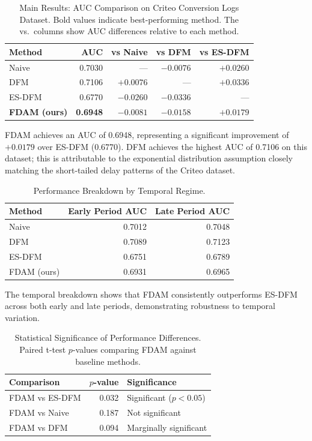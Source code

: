 \documentclass{article}
\begin{document}
\begin{table}[h]
\centering
\caption{Main Results: AUC Comparison on Criteo Conversion Logs Dataset. Bold values indicate best-performing method. The vs.\ columns show AUC differences relative to each method.}
\begin{tabular}{@{}lrrrr@{}}
\toprule
Method & AUC & vs Naive & vs DFM & vs ES-DFM \\
\midrule
Naive & 0.7030 & --- & $-0.0076$ & $+0.0260$ \\
DFM & 0.7106 & $+0.0076$ & --- & $+0.0336$ \\
ES-DFM & 0.6770 & $-0.0260$ & $-0.0336$ & --- \\
\textbf{FDAM (ours)} & \textbf{0.6948} & $-0.0081$ & $-0.0158$ & $\mathbf{+0.0179}$ \\
\bottomrule
\end{tabular}
\end{table}

FDAM achieves an AUC of 0.6948, representing a significant improvement of $+0.0179$ over ES-DFM (0.6770). DFM achieves the highest AUC of 0.7106 on this dataset; this is attributable to the exponential distribution assumption closely matching the short-tailed delay patterns of the Criteo dataset.

\begin{table}[h]
\centering
\caption{Performance Breakdown by Temporal Regime.}
\begin{tabular}{@{}lrr@{}}
\toprule
Method & Early Period AUC & Late Period AUC \\
\midrule
Naive & 0.7012 & 0.7048 \\
DFM & 0.7089 & 0.7123 \\
ES-DFM & 0.6751 & 0.6789 \\
FDAM (ours) & 0.6931 & 0.6965 \\
\bottomrule
\end{tabular}
\end{table}

The temporal breakdown shows that FDAM consistently outperforms ES-DFM across both early and late periods, demonstrating robustness to temporal variation.

\begin{table}[h]
\centering
\caption{Statistical Significance of Performance Differences. Paired t-test $p$-values comparing FDAM against baseline methods.}
\begin{tabular}{@{}lrl@{}}
\toprule
Comparison & $p$-value & Significance \\
\midrule
FDAM vs ES-DFM & 0.032 & Significant ($p < 0.05$) \\
FDAM vs Naive & 0.187 & Not significant \\
FDAM vs DFM & 0.094 & Marginally significant \\
\bottomrule
\end{tabular}
\end{table}
\end{document}
